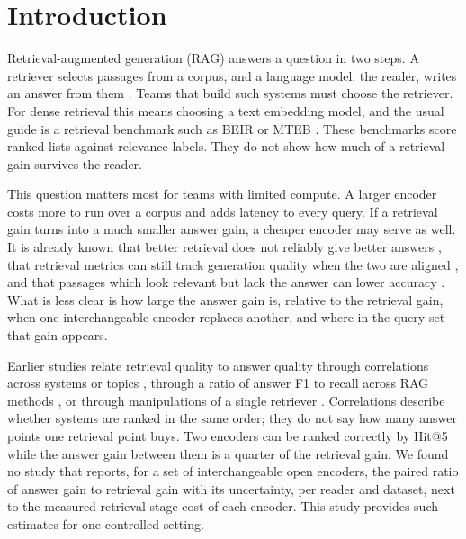 \section{Introduction}\label{sec:intro}

Retrieval-augmented generation (RAG) answers a question in two steps. A retriever selects passages from a corpus, and a language model, the reader, writes an answer from them \citep{lewis2020rag,izacard2021fid,ram2023incontext}. Teams that build such systems must choose the retriever. For dense retrieval this means choosing a text embedding model, and the usual guide is a retrieval benchmark such as BEIR \citep{thakur2021beir} or MTEB \citep{muennighoff2023mteb}. These benchmarks score ranked lists against relevance labels. They do not show how much of a retrieval gain survives the reader.

This question matters most for teams with limited compute. A larger encoder costs more to run over a corpus and adds latency to every query. If a retrieval gain turns into a much smaller answer gain, a cheaper encoder may serve as well. It is already known that better retrieval does not reliably give better answers \citep{salemi2024erag,mathur2026policy,medrano2026fusion,ghosh2026evidence}, that retrieval metrics can still track generation quality when the two are aligned \citep{samuel2026beyond,hitl2026comparative}, and that passages which look relevant but lack the answer can lower accuracy \citep{cuconasu2024power,amiraz2025distracting,shi2023distracted}. What is less clear is how large the answer gain is, relative to the retrieval gain, when one interchangeable encoder replaces another, and where in the query set that gain appears.

Earlier studies relate retrieval quality to answer quality through correlations across systems or topics \citep{salemi2024erag,samuel2026beyond,trappolini2025udcg}, through a ratio of answer F1 to recall across RAG methods \citep{peng2026neocorrag}, or through manipulations of a single retriever \citep{leto2024toward}. Correlations describe whether systems are ranked in the same order; they do not say how many answer points one retrieval point buys. Two encoders can be ranked correctly by Hit@5 while the answer gain between them is a quarter of the retrieval gain. We found no study that reports, for a set of interchangeable open encoders, the paired ratio of answer gain to retrieval gain with its uncertainty, per reader and dataset, next to the measured retrieval-stage cost of each encoder. This study provides such estimates for one controlled setting.

